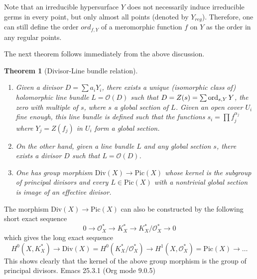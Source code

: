 \documentclass[11pt]{article}
\newtheorem{theorem}{Theorem}
\newcommand{\ord}{\mathop{\rm ord}\nolimits}
\begin{document}
Note that an irreducible hypersurface \(Y\) does not necessarily induce irreducible
germs in every point, but only almost all points (denoted by \(Y_{reg}\)). Therefore, one
can still define the order \(ord_{f,Y}\) of a meromorphic function \(f\) on \(Y\) as
the order in any regular points.

The next theorem follows immediately from the above discussion.
\begin{theorem}[Divisor-Line bundle relation]
\label{thm:div-pic-rel}
\begin{enumerate}
\item Given a divisor \(D = \sum a_i Y_i\), there exists a unique (isomorphic class of)
holomorphic line bundle \(L = \mathcal{O}(D)\) such that \(D =Z(s) = \sum \ord_{s,Y} Y\), the zero with
multiple of \(s\), where \(s\) a global section of \(L\). Given an open cover \(U_i\) fine enough, this line bundle is defined such that the functions \(s_i = \prod
   f_j^{\alpha_j}\) where \(Y_j = Z(f_j)\) in \(U_i\) form a global section.
\item On the other hand, given a line bundle \(L\) and any global section \(s\), there
exists a divisor \(D\) such that \(L = \mathcal{O}(D)\).
\item One has group morphism \(\text{Div}(X) \longrightarrow \text{Pic}(X)\) whose kernel
is the subgroup of principal divisors and every \(L\in \text{Pic}(X)\) with a
nontrivial global section is image of an effective divisor.
\end{enumerate}
\end{theorem}

The morphism \(\text{Div}(X) \longrightarrow \text{Pic}(X)\) can also be constructed by
the following short exact sequence
\[
0 \longrightarrow \mathcal{O}_X^* \longrightarrow K_X^* \longrightarrow K_X^*/
\mathcal{O}_X^* \longrightarrow 0
\]
which gives the long exact sequence
\[
H^0(X,K_X^*) \longrightarrow \text{Div}(X) = H^0(K_X^*/\mathcal{O}_X^*) \longrightarrow
H^1(X, \mathcal{O}_X^*) = \text{Pic}(X) \longrightarrow \dots
\]
This shows clearly that the kernel of the above group morphism is the group of principal divisors.
Emacs 25.3.1 (Org mode 9.0.5)
\end{document}
